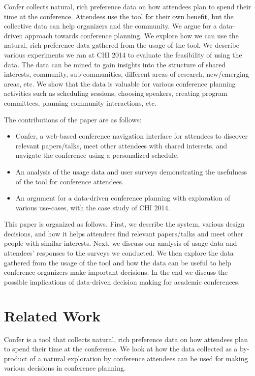 \documentclass{sigchi}
\begin{document}
Confer collects natural, rich preference data on how attendees plan to spend their time at the conference. Attendees use the tool for their own benefit, but the collective data can help organizers and the community. We argue for a data-driven approach towards conference planning. We explore how we can use the natural, rich preference data gathered from the usage of the tool. We describe various experiments we ran at CHI 2014 to evaluate the feasibility of using the data. The data can be mined to gain insights into the structure of shared interests, community, sub-communities, different areas of research, new/emerging areas, etc. We show that the data is valuable for various conference planning activities such as scheduling sessions, choosing speakers, creating program committees, planning community interactions, etc.

The contributions of the paper are as follows:
\begin{itemize}
\item Confer, a web-based conference navigation interface for attendees to discover relevant papers/talks, meet other attendees with shared interests, and navigate the conference using a personalized schedule.
\item An analysis of the usage data and user surveys demonstrating the usefulness of the tool for conference attendees.
\item An argument for a data-driven conference planning with exploration of various use-cases, with the case study of CHI 2014.
\end{itemize}

This paper is organized as follows. First, we describe the system, various design decisions, and how it helps attendees find relevant papers/talks and meet other people with similar interests. Next, we discuss our analysis of usage data and attendees' responses to the surveys we conducted. We then explore the data gathered from the usage of the tool and how the data can be useful to help conference organizers make important decisions. In the end we discuss the possible implications of data-driven decision making for academic conferences.

\section{Related Work}
Confer is a tool that collects natural, rich preference data on how attendees plan to spend their time at the conference. We look at how the data collected as a by-product of a natural exploration by conference attendees can be used for making various decisions in conference planning.
\end{document}
